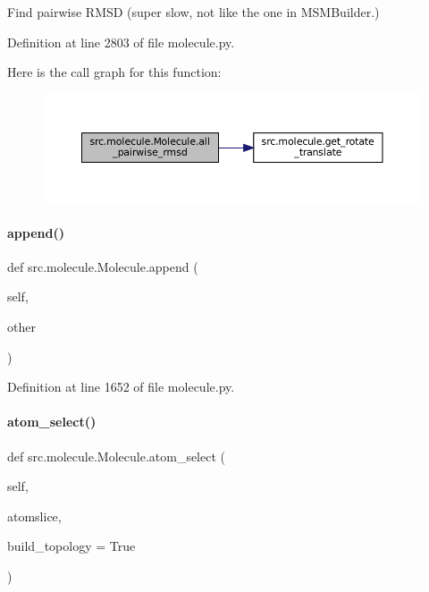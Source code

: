 Find pairwise R\+M\+SD (super slow, not like the one in M\+S\+M\+Builder.) 



Definition at line 2803 of file molecule.\+py.

Here is the call graph for this function\+:
\nopagebreak
\begin{figure}[H]
\begin{center}
\leavevmode
\includegraphics[width=350pt]{classsrc_1_1molecule_1_1Molecule_ac2da956804fed7a98341c94582838f26_cgraph}
\end{center}
\end{figure}
\mbox{\label{classsrc_1_1molecule_1_1Molecule_a1969b621b7e6e65722ec245b74518cfe}} 
\paragraph{\texorpdfstring{append()}{append()}}
{\footnotesize\ttfamily def src.\+molecule.\+Molecule.\+append (\begin{DoxyParamCaption}\item[{}]{self,  }\item[{}]{other }\end{DoxyParamCaption})}



Definition at line 1652 of file molecule.\+py.

\mbox{\label{classsrc_1_1molecule_1_1Molecule_af7b405613971e5d76720b1a655e05981}} 
\paragraph{\texorpdfstring{atom\+\_\+select()}{atom\_select()}}
{\footnotesize\ttfamily def src.\+molecule.\+Molecule.\+atom\+\_\+select (\begin{DoxyParamCaption}\item[{}]{self,  }\item[{}]{atomslice,  }\item[{}]{build\+\_\+topology = {\ttfamily True} }\end{DoxyParamCaption})}



